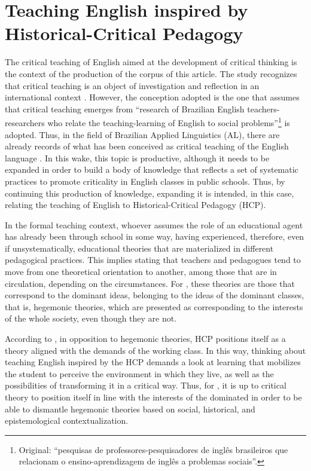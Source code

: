 \documentclass[english]{textolivre}
\begin{document}
\section{Teaching English inspired by Historical-Critical Pedagogy}

The critical teaching of English aimed at the development of critical thinking is the context of the production of the corpus of this article. The study recognizes that critical teaching is an object of investigation and reflection in an international context \cite{ahangari2014effect, bobkina_literature_2016, sobkowiak_critical_2016, suarcaya2017investigating, sadeghi2020iranian}. However, the conception adopted is the one that assumes that critical teaching emerges from “research of Brazilian English teachers-researchers who relate the teaching-learning of English to social problems”\footnote{Original: “pesquisas de professores-pesquisadores de inglês brasileiros que relacionam o ensino-aprendizagem de inglês a problemas sociais”.}\cite[p. 141]{lima_ensino_2021} is adopted. Thus, in the field of Brazilian Applied Linguistics (AL), there are already records of what has been conceived as critical teaching of the English language \cite[among others]{urzeda-freitas_educando_2012, costados2011visualizaccao, caetano_but_2020, mulico_learning_2020}. In this wake, this topic is productive, although it needs to be expanded in order to build a body of knowledge that reflects a set of systematic practices to promote criticality in English classes in public schools. Thus, by continuing this production of knowledge, expanding it is intended, in this case, relating the teaching of English to Historical-Critical Pedagogy (HCP).

In the formal teaching context, whoever assumes the role of an educational agent has already been through school in some way, having experienced, therefore, even if unsystematically, educational theories that are materialized in different pedagogical practices. This implies stating that teachers and pedagogues tend to move from one theoretical orientation to another, among those that are in circulation, depending on the circumstances. For \textcite{saviani_pedagogia_2019}, these theories are those that correspond to the dominant ideas, belonging to the ideas of the dominant classes, that is, hegemonic theories, which are presented as corresponding to the interests of the whole society, even though they are not.

According to \textcite[p.18]{galvao2019fundamentos}, in opposition to hegemonic theories, HCP positions itself as a theory aligned with the demands of the working class. In this way, thinking about teaching English inspired by the HCP demands a look at learning that mobilizes the student to perceive the environment in which they live, as well as the possibilities of transforming it in a critical way. Thus, for \textcite{saviani_pedagogia_2019}, it is up to critical theory to position itself in line with the interests of the dominated in order to be able to dismantle hegemonic theories based on social, historical, and epistemological contextualization.
\end{document}
